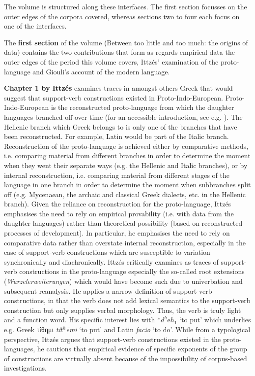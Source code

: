 \documentclass[output=paper,colorlinks,citecolor=brown]{langscibook}
\begin{document}
The volume is structured along these interfaces. The first section focusses on the outer edges of the corpora covered, whereas sections two to four each focus on one of the interfaces. 


The \textbf{first section} of the volume (Between too little and too much: the origins of data) contains the two contributions that form as regards empirical data the outer edges of the period this volume covers, Ittzés’ examination of the proto-language and Giouli’s account of the modern language. 


\textbf{Chapter 1 by Ittzés} examines traces in amongst others Greek that would suggest that support-verb constructions existed in Proto-Indo-European. Proto-Indo-European is the reconstructed proto-language from which the daughter languages branched off over time (for an accessible introduction, see e.g. \citealt{sihlerNewComparativeGrammar2008}). The Hellenic branch which Greek belongs to is only one of the branches that have been reconstructed. For example, Latin would be part of the Italic branch. Reconstruction of the proto-language is achieved either by comparative methods, i.e. comparing material from different branches in order to determine the moment when they went their separate ways (e.g. the Hellenic and Italic branches), or by internal reconstruction, i.e. comparing material from different stages of the language in one branch in order to determine the moment when subbranches split off (e.g. Mycenaean, the archaic and classical Greek dialects, etc. in the Hellenic branch). Given the reliance on reconstruction for the proto-language, Ittzés emphasises the need to rely on empirical provability (i.e. with data from the daughter languages) rather than theoretical possibility (based on reconstructed processes of development). In particular, he emphasises the need to rely on comparative data rather than overstate internal reconstruction, especially in the case of support-verb constructions which are susceptible to variation synchronically and diachronically. Ittzés critically examines as traces of support-verb constructions in the proto-language especially the so-called root extensions (\textit{Wurzelerweiterungen}) which would have become such due to univerbation and subsequent reanalysis. He applies a narrow definition of support-verb constructions, in that the verb does not add lexical semantics to the support-verb construction but only supplies verbal morphology. Thus, the verb is truly light and a function word. His specific interest lies with *$d^h$e$h_1$ ‘to put’ which underlies e.g. Greek τίθημι \textit{tí$t^h$ēmi} ‘to put’ and Latin \textit{facio} ‘to do’. While from a typological perspective, Ittzés argues that support-verb constructions existed in the proto-languages, he cautions that empirical evidence of specific exponents of the group of constructions are virtually absent because of the impossibility of corpus-based investigations. 
\end{document}
